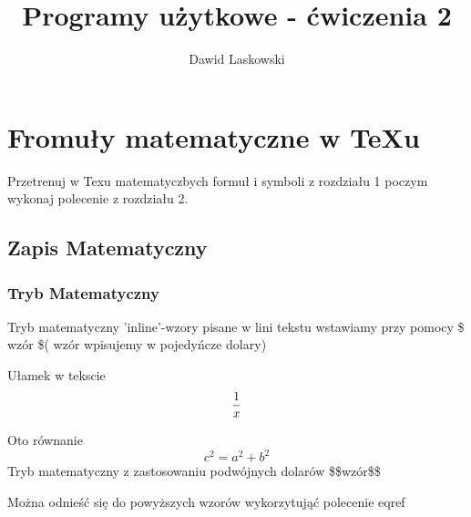 \documentclass[a4paper,12pt]{article}
\title{Programy użytkowe - ćwiczenia 2 }
\author{Dawid Laskowski}
\begin{document}
\maketitle

\section{  Fromuły matematyczne w TeXu}\label{sec:tekst}

Przetrenuj w Texu matematyczbych formuł i symboli z rozdziału 1 poczym wykonaj polecenie z rozdziału 2.

\subsection{  Zapis Matematyczny}\label{sec:zapis}

\subsubsection{  Tryb Matematyczny}\label{sec:tryb}
\frenchspacing
Tryb matematyczny 'inline'-wzory pisane w lini tekstu wstawiamy przy pomocy \$ wzór \$( wzór wpisujemy w pojedyńcze dolary)
\frenchspacing

Ułamek w tekscie
$$
 \frac{1}{x}\\
$$

Oto równanie 
$$
c^{2}=a^{2}+b^{2}
$$
\frenchspacing
Tryb matematyczny z zastosowaniu podwójnych dolarów  \$\$wzór\$\$ 

Można odnieść się do powyższych wzorów wykorzytująć polecenie eqref
\end{document}
